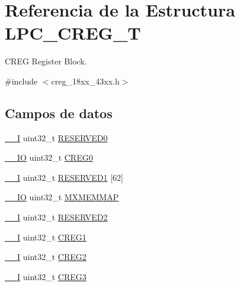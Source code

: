 \hypertarget{struct_l_p_c___c_r_e_g___t}{}\section{Referencia de la Estructura L\+P\+C\+\_\+\+C\+R\+E\+G\+\_\+T}
\label{struct_l_p_c___c_r_e_g___t}


C\+R\+EG Register Block.  




{\ttfamily \#include $<$creg\+\_\+18xx\+\_\+43xx.\+h$>$}

\subsection*{Campos de datos}
\begin{DoxyCompactItemize}
\item 
\hyperlink{core__sc300_8h_af63697ed9952cc71e1225efe205f6cd3}{\+\_\+\+\_\+I} uint32\+\_\+t \hyperlink{struct_l_p_c___c_r_e_g___t_ad06839c5382047f4f9f2c74cc61db942}{R\+E\+S\+E\+R\+V\+E\+D0}
\item 
\hyperlink{core__sc300_8h_aec43007d9998a0a0e01faede4133d6be}{\+\_\+\+\_\+\+IO} uint32\+\_\+t \hyperlink{struct_l_p_c___c_r_e_g___t_a2e846ad10e3f493297ed99747086ffb0}{C\+R\+E\+G0}
\item 
\hyperlink{core__sc300_8h_af63697ed9952cc71e1225efe205f6cd3}{\+\_\+\+\_\+I} uint32\+\_\+t \hyperlink{struct_l_p_c___c_r_e_g___t_a083abb7cb5e268b721ad9da5e9533593}{R\+E\+S\+E\+R\+V\+E\+D1} \mbox{[}62\mbox{]}
\item 
\hyperlink{core__sc300_8h_aec43007d9998a0a0e01faede4133d6be}{\+\_\+\+\_\+\+IO} uint32\+\_\+t \hyperlink{struct_l_p_c___c_r_e_g___t_af024029ef87447fa486fb7143f2a3821}{M\+X\+M\+E\+M\+M\+AP}
\item 
\hyperlink{core__sc300_8h_af63697ed9952cc71e1225efe205f6cd3}{\+\_\+\+\_\+I} uint32\+\_\+t \hyperlink{struct_l_p_c___c_r_e_g___t_a13d8c36a296a876371d8e463cfce0bc5}{R\+E\+S\+E\+R\+V\+E\+D2}
\item 
\hyperlink{core__sc300_8h_af63697ed9952cc71e1225efe205f6cd3}{\+\_\+\+\_\+I} uint32\+\_\+t \hyperlink{struct_l_p_c___c_r_e_g___t_a7737f3d7015ff2d626ce7701a42e1f17}{C\+R\+E\+G1}
\item 
\hyperlink{core__sc300_8h_af63697ed9952cc71e1225efe205f6cd3}{\+\_\+\+\_\+I} uint32\+\_\+t \hyperlink{struct_l_p_c___c_r_e_g___t_ad6c2620a8674135a34404595014e8753}{C\+R\+E\+G2}
\item 
\hyperlink{core__sc300_8h_af63697ed9952cc71e1225efe205f6cd3}{\+\_\+\+\_\+I} uint32\+\_\+t \hyperlink{struct_l_p_c___c_r_e_g___t_afee4ee92f4f379ca0554d226ba1f270d}{C\+R\+E\+G3}

\end{DoxyCompactItemize}

